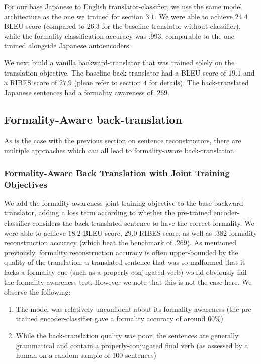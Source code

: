 \documentclass[11pt]{article}
\begin{document}
For our base Japanese to English translator-classifier, we use the same model architecture as the one we trained for section $3.1$. We were able to achieve $24.4$ BLEU score (compared to $26.3$ for the baseline translator without classifier), while the formality classification accuracy was $.993$, comparable to the one trained alongside Japanese autoencoders. 

We next build a vanilla backward-translator that was trained solely on the translation objective. The baseline back-translator had a BLEU score of $19.1$ and a RIBES score of $27.9$ (pleae refer to section $4$ for details). The back-translated Japanese sentences had a formality awareness of $.269$.

\subsection{Formality-Aware back-translation}

As is the case with the previous section on sentence reconstructors, there are multiple approaches which can all lead to formality-aware back-translation.

\subsubsection{Formality-Aware Back Translation with Joint Training Objectives}

We add the formality awareness joint training objective to the base backward-translator, adding a loss term according to whether the pre-trained encoder-classifier considers the back-translated sentence to have the correct formality. We were able to achieve $18.2$ BLEU score, $29.0$ RIBES score, as well as $.382$ formality reconstruction accuracy (which beat the benchmark of $.269$). As mentioned previously, formality reconstruction accuracy is often upper-bounded by the quality of the translation: a translated sentence that was so malformed that it lacks a formality cue (such as a properly conjugated verb) would obviously fail the formality awareness test. However we note that this is not the case here. We observe the following:

\begin{enumerate}[label=\arabic*]
    \item The model was relatively unconfident about its formality awareness (the pre-trained encoder-classifier gave a formality accuracy of around $60\%$)
    \item While the back-translation quality was poor, the sentences are generally grammatical and contain a properly-conjugated final verb (as assessed by a human on a random sample of $100$ sentences)
\end{enumerate}
\end{document}
